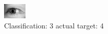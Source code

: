 \begin{figure}[h!]
\begin{center}
\includegraphics[width=0.60\columnwidth]{figures/ID3163_class_3_target_4.png}
\end{center}
\caption{ Classification: 3 actual target: 4}
\label{fig:ID3163_class_3_target_4}
\end{figure}
